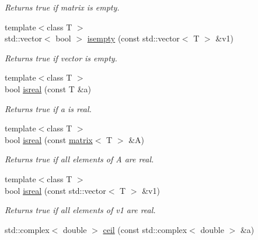 \begin{DoxyCompactItemize}
\begin{DoxyCompactList}\small\item\em Returns true if matrix is empty. \end{DoxyCompactList}\item 
\hypertarget{namespacekeycpp_a0bffe72cf3a118ccaaa6f195c4859550}{{\footnotesize template$<$class T $>$ }\\std\-::vector$<$ bool $>$ \hyperlink{namespacekeycpp_a0bffe72cf3a118ccaaa6f195c4859550}{isempty} (const std\-::vector$<$ T $>$ \&v1)}\label{namespacekeycpp_a0bffe72cf3a118ccaaa6f195c4859550}

\begin{DoxyCompactList}\small\item\em Returns true if vector is empty. \end{DoxyCompactList}\item 
\hypertarget{namespacekeycpp_a81a8c955cdbeb60181f6bf7d6553ac53}{{\footnotesize template$<$class T $>$ }\\bool \hyperlink{namespacekeycpp_a81a8c955cdbeb60181f6bf7d6553ac53}{isreal} (const T \&a)}\label{namespacekeycpp_a81a8c955cdbeb60181f6bf7d6553ac53}

\begin{DoxyCompactList}\small\item\em Returns true if a is real. \end{DoxyCompactList}\item 
\hypertarget{namespacekeycpp_a62d7118882bac24ab403ffb5f8ee7034}{{\footnotesize template$<$class T $>$ }\\bool \hyperlink{namespacekeycpp_a62d7118882bac24ab403ffb5f8ee7034}{isreal} (const \hyperlink{classkeycpp_1_1matrix}{matrix}$<$ T $>$ \&A)}\label{namespacekeycpp_a62d7118882bac24ab403ffb5f8ee7034}

\begin{DoxyCompactList}\small\item\em Returns true if all elements of A are real. \end{DoxyCompactList}\item 
\hypertarget{namespacekeycpp_ad811cd86faad44bdf322b55d332fee29}{{\footnotesize template$<$class T $>$ }\\bool \hyperlink{namespacekeycpp_ad811cd86faad44bdf322b55d332fee29}{isreal} (const std\-::vector$<$ T $>$ \&v1)}\label{namespacekeycpp_ad811cd86faad44bdf322b55d332fee29}

\begin{DoxyCompactList}\small\item\em Returns true if all elements of v1 are real. \end{DoxyCompactList}\item 
\hypertarget{namespacekeycpp_a005c1190f7087fb1d2545c38c080fd1a}{std\-::complex$<$ double $>$ \hyperlink{namespacekeycpp_a005c1190f7087fb1d2545c38c080fd1a}{ceil} (const std\-::complex$<$ double $>$ \&a)}\label{namespacekeycpp_a005c1190f7087fb1d2545c38c080fd1a}


\end{DoxyCompactItemize}
